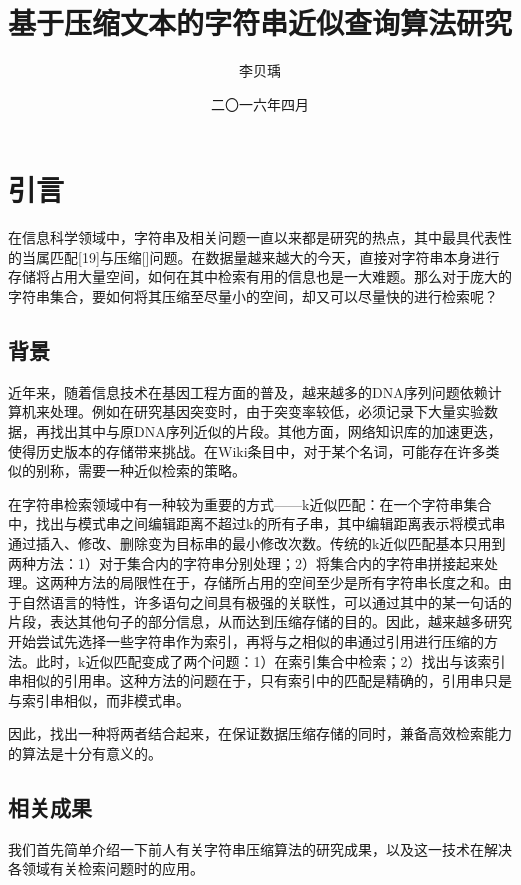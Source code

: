 ﻿\documentclass{sysuthesis}
\title{基于压缩文本的字符串近似查询算法研究}
\author{李贝瑀}
\date{二〇一六年四月}
\begin{document}
\frontmatter

\cleardoublepage
\tableofcontents

\mainmatter



\chapter{引言}
在信息科学领域中，字符串及相关问题一直以来都是研究的热点，其中最具代表性的当属匹配[19]与压缩[]问题。在数据量越来越大的今天，直接对字符串本身进行存储将占用大量空间，如何在其中检索有用的信息也是一大难题。那么对于庞大的字符串集合，要如何将其压缩至尽量小的空间，却又可以尽量快的进行检索呢？



\section{背景}
近年来，随着信息技术在基因工程方面的普及，越来越多的DNA序列问题依赖计算机来处理。例如在研究基因突变时，由于突变率较低，必须记录下大量实验数据，再找出其中与原DNA序列近似的片段。其他方面，网络知识库的加速更迭，使得历史版本的存储带来挑战。在Wiki条目中，对于某个名词，可能存在许多类似的别称，需要一种近似检索的策略。\par
在字符串检索领域中有一种较为重要的方式——k近似匹配：在一个字符串集合中，找出与模式串之间编辑距离不超过k的所有子串，其中编辑距离表示将模式串通过插入、修改、删除变为目标串的最小修改次数。传统的k近似匹配基本只用到两种方法：1）对于集合内的字符串分别处理；2）将集合内的字符串拼接起来处理。这两种方法的局限性在于，存储所占用的空间至少是所有字符串长度之和。由于自然语言的特性，许多语句之间具有极强的关联性，可以通过其中的某一句话的片段，表达其他句子的部分信息，从而达到压缩存储的目的。因此，越来越多研究开始尝试先选择一些字符串作为索引，再将与之相似的串通过引用进行压缩的方法。此时，k近似匹配变成了两个问题：1）在索引集合中检索；2）找出与该索引串相似的引用串。这种方法的问题在于，只有索引中的匹配是精确的，引用串只是与索引串相似，而非模式串。\par
因此，找出一种将两者结合起来，在保证数据压缩存储的同时，兼备高效检索能力的算法是十分有意义的。



\section{相关成果}
我们首先简单介绍一下前人有关字符串压缩算法的研究成果，以及这一技术在解决各领域有关检索问题时的应用。
\end{document}
